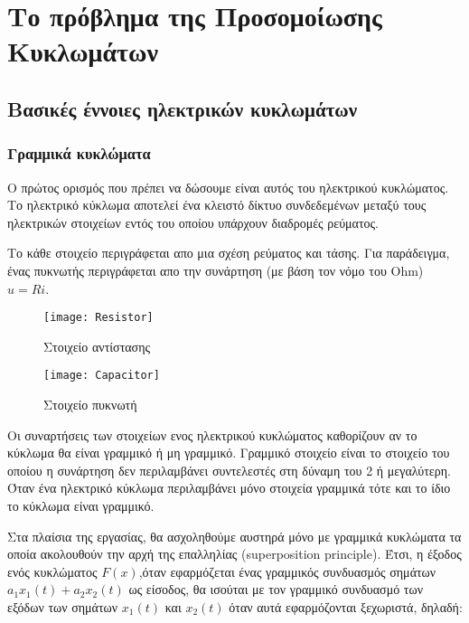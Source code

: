 \chapter{Το πρόβλημα της Προσομοίωσης Κυκλωμάτων}
\label{ch:2.chapterCircuitSimulationPrinciples}
    
\section{Βασικές έννοιες ηλεκτρικών κυκλωμάτων}

\subsection{Γραμμικά κυκλώματα}

Ο πρώτος ορισμός που πρέπει να δώσουμε είναι αυτός του ηλεκτρικού κυκλώματος. Το ηλεκτρικό κύκλωμα αποτελεί ένα κλειστό δίκτυο συνδεδεμένων μεταξύ τους ηλεκτρικών στοιχείων εντός του οποίου υπάρχουν διαδρομές ρεύματος.

Το κάθε στοιχείο περιγράφεται απο μια σχέση ρεύματος και τάσης. Για παράδειγμα, ένας πυκνωτής περιγράφεται απο την συνάρτηση (με βάση τον νόμο του \textlatin{Ohm}) $u = Ri$.

\begin{figure}
    \centering
    \begin{minipage}{0.45\textwidth}
        \centering
        \texttt{[image: Resistor]}
        \caption{Στοιχείο αντίστασης}
    \end{minipage}\hfill
    \begin{minipage}{0.45\textwidth}
        \centering
        \texttt{[image: Capacitor]}
        \caption{Στοιχείο πυκνωτή}
    \end{minipage}
\end{figure}


Οι συναρτήσεις των στοιχείων ενος ηλεκτρικού κυκλώματος καθορίζουν αν το κύκλωμα θα είναι γραμμικό ή μη γραμμικό. Γραμμικό στοιχείο είναι το στοιχείο του οποίου η συνάρτηση δεν περιλαμβάνει συντελεστές στη δύναμη του 2 ή μεγαλύτερη.
Όταν ένα ηλεκτρικό κύκλωμα περιλαμβάνει μόνο στοιχεία γραμμικά τότε και το ίδιο το κύκλωμα είναι γραμμικό.

Στα πλαίσια της εργασίας, θα ασχοληθούμε αυστηρά μόνο με γραμμικά κυκλώματα τα οποία ακολουθούν την αρχή της επαλληλίας (\textlatin{superposition principle}).  Έτσι, η έξοδος ενός κυκλώματος $F(x)$,όταν εφαρμόζεται ένας γραμμικός συνδυασμός σημάτων $a_1x_1(t) + a_2x_2(t)$ ως είσοδος, θα ισούται με τον γραμμικό συνδυασμό των εξόδων των σημάτων $x_1(t)$ και $x_2(t)$ όταν αυτά εφαρμόζονται ξεχωριστά, δηλαδή:

